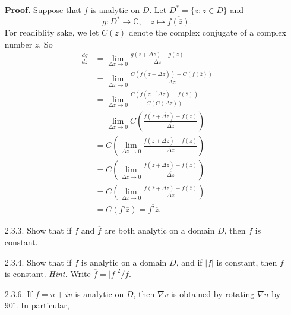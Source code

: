 \documentclass[9pt]{article}
\newcommand{\C}{\mathbb{C}}
\begin{document}
\begin{enumerate}
      \textbf{Proof.} Suppose that $f$ is analytic on $D$. Let
      $D^* = \{\overline{z} : z \in D\}$ and
      $$g : D^* \rightarrow \C, \quad z \mapsto\overline{f(\overline{z})}.$$
      For readiblity sake, we let $C(z)$ denote the complex conjugate of a
      complex number $z$. So
      \begin{align*}
         \frac{dg}{dz} &= \lim_{\Delta z \rightarrow 0}
            \frac{g(z + \Delta z) - g(z)}{\Delta z} \\
            &= \lim_{\Delta z \rightarrow 0}
            \frac{C(f(\overline{z + \Delta z})) -
               C(f(\overline{z}))}{\Delta z} \\
            &= \lim_{\Delta z \rightarrow 0}
            \frac{C(f(\overline{z + \Delta z}) -
               f(\overline{z}))}{C(C(\Delta z))} \\
            &= \lim_{\Delta z \rightarrow 0}
            C\left(\frac{f(\overline{z} + \overline{\Delta z}) -
               f(\overline{z})}{\overline{\Delta z}}\right) \\
            &= C\left(\lim_{\Delta z \rightarrow 0}
            \frac{f(\overline{z} + \overline{\Delta z}) -
               f(\overline{z})}{\overline{\Delta z}}\right) \\
            &= C\left(\lim_{\overline{\Delta z} \rightarrow 0}
            \frac{f(\overline{z} + \overline{\Delta z}) -
               f(\overline{z})}{\overline{\Delta z}}\right) \\
            &= C\left(\lim_{\Delta z \rightarrow 0}
            \frac{f(\overline{z} + \Delta z) -
               f(\overline{z})}{\Delta z}\right) \\
            &= C(f'\overline{z}) = \overline{f'\overline{z}}.
      \end{align*}
   \item[2.3.3.]  Show that if $f$ and $\overline{f}$ are both analytic on a
                  domain $D$, then $f$ is constant.
   \item[2.3.4.]  Show that if $f$ is analytic on a domain $D$, and if $|f|$ is
                  constant, then $f$ is constant. \textit{Hint.} Write
                  $\overline{f} = |f|^2/f$.
   \item[2.3.6.]  If $f = u + iv$ is analytic on $D$, then $\nabla v$ is
                  obtained by rotating $\nabla u$ by $90^\circ$. In particular,

\end{enumerate}
\end{document}
